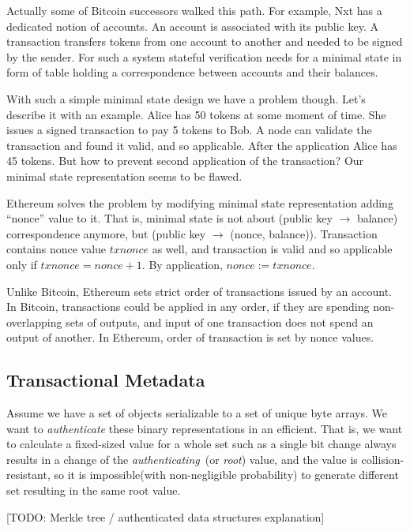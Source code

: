 \documentclass[]{report}   %
\begin{document}
Actually some of Bitcoin successors walked this path. For example, Nxt has a dedicated notion of accounts. An account is associated with its public key. A transaction transfers tokens from one account to another and needed to be signed by the sender. For such a system stateful verification needs for a minimal state in form of table holding a correspondence between accounts and their balances.

With such a simple minimal state design we have a problem though. Let's describe it with an example. Alice has 50 tokens at some moment of time. She issues a signed transaction to pay 5 tokens to Bob. A node can validate the transaction and found it valid, and so applicable. After the application Alice has 45 tokens. But how to prevent second application of the transaction? Our minimal state representation seems to be flawed.

Ethereum solves the problem by modifying minimal state representation adding ``nonce'' value to it. That is, minimal state is not about (public key $\rightarrow$ balance) correspondence anymore, but (public key $\rightarrow$ (nonce, balance)). Transaction contains nonce value \(txnonce\) as well, and transaction is valid and so applicable only if \(txnonce = nonce + 1\). By application, \(nonce := txnonce\). 

Unlike Bitcoin, Ethereum sets strict order of transactions issued by an account. In Bitcoin, transactions could be applied in any order, 
if they are spending non-overlapping sets of outputs, and input of one transaction does not spend an output of another. In Ethereum, order of transaction is set by nonce values. 



\subsection{Transactional Metadata}

Assume we have a set of objects serializable to a set of unique byte arrays. We want to \textit{authenticate} these binary representations in an efficient. That is, we want to calculate a fixed-sized value for a whole set such as a single bit change always results in a change of the \textit{authenticating}~(or \textit{root}) value, and the value is collision-resistant, so it is impossible(with non-negligible probability) to generate different set resulting in the same root value. 

[TODO: Merkle tree / authenticated data structures explanation]
\end{document}
